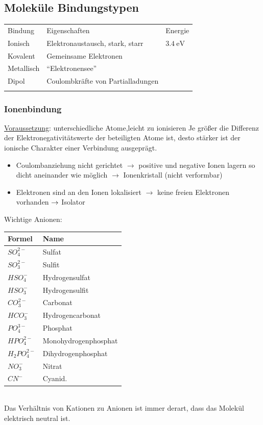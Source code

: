 \documentclass[eglish/german]{latex4ei/latex4ei_sheet}
\begin{document}
\begin{sectionbox}
	\section{Moleküle Bindungstypen}
		\begin{tabular*}{\columnwidth}{@{\extracolsep\fill}lll@{}}
		\ctrule
				Bindung & Eigenschaften & Energie \\\cmrule
		Ionisch & Elektronaustausch, stark, starr & $\SI{3.4}{\electronvolt}$ \\
		Kovalent & Gemeinsame Elektronen & \\
		Metallisch & "`Elektronensee"' &  \\
		Dipol & Coulombkräfte von Partialladungen  & \\
		\ctrule
		\end{tabular*}

	\subsubsection{Ionenbindung}
		\underline{Voraussetzung}: unterschiedliche Atome,leicht zu ionisieren
		Je größer die Differenz der Elektronegativitätswerte der beteiligten Atome ist, desto
		stärker ist der ionische Charakter einer Verbindung ausgeprägt.\\
		\begin{itemize}
			\item Coulombanziehung nicht gerichtet $\rightarrow$ positive und negative Ionen lagern so dicht aneinander wie möglich $\rightarrow$ Ionenkristall (nicht verformbar)
			\item Elektronen sind an den Ionen lokalisiert $\rightarrow$ keine freien Elektronen vorhanden $\rightarrow $ Isolator
		\end{itemize}
		Wichtige Anionen:\\
		\begin{tabular}{ll}
			\textbf{Formel} & \textbf{Name}\\
			\midrule
			$SO^{2-}_{4}$ & Sulfat\\
			\midrule
			$SO^{2-}_{3}$ & Sulfit\\
			\midrule
			$HSO^{-}_{4}$ & Hydrogensulfat\\
			\midrule
			$HSO^{-}_{3}$ & Hydrogensulfit\\
			\midrule
			$CO^{2-}_{3}$ & Carbonat\\
			\midrule
			$HCO^{-}_{3}$ & Hydrogencarbonat\\
			\midrule
			$PO^{3-}_{4}$ & Phosphat\\
			\midrule
			$HPO^{2-}_{4}$ & Monohydrogenphosphat\\
			\midrule
			$H_2PO^{2-}_{4}$ & Dihydrogenphosphat\\
			\midrule
			$NO^{-}_{3}$ & Nitrat\\
			\midrule
			$CN^{-}$ & Cyanid.\\
		\end{tabular}\\
	Das Verhältnis von Kationen zu Anionen ist immer derart,
	dass das Molekül elektrisch neutral ist.
		
	\end{sectionbox}
\end{document}

